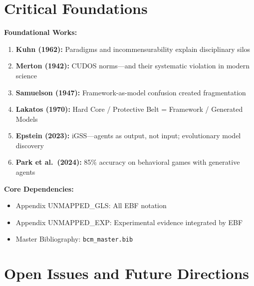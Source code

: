 \section{Critical Foundations}
\label{sec:meta-foundations}

\begin{tcolorbox}[colback=yellow!5!white, colframe=yellow!75!black,
    title=\textbf{Critical Foundations for LIT-META}]

\textbf{Foundational Works:}
\begin{enumerate}[nosep]
    \item \textbf{Kuhn (1962):} Paradigms and incommensurability explain disciplinary silos
    \item \textbf{Merton (1942):} CUDOS norms—and their systematic violation in modern science
    \item \textbf{Samuelson (1947):} Framework-as-model confusion created fragmentation
    \item \textbf{Lakatos (1970):} Hard Core / Protective Belt = Framework / Generated Models
    \item \textbf{Epstein (2023):} iGSS---agents as output, not input; evolutionary model discovery
    \item \textbf{Park et al.\ (2024):} 85\% accuracy on behavioral games with generative agents
\end{enumerate}

\textbf{Core Dependencies:}
\begin{itemize}[nosep]
    \item Appendix UNMAPPED_GLS: All EBF notation
    \item Appendix UNMAPPED_EXP: Experimental evidence integrated by EBF
    \item Master Bibliography: \texttt{bcm\_master.bib}
\end{itemize}

\end{tcolorbox}


\section{Open Issues and Future Directions}
\label{sec:meta-open-issues}

